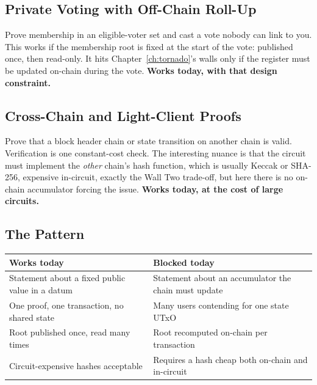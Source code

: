 \subsection*{Private Voting with Off-Chain Roll-Up}

Prove membership in an eligible-voter set and cast a vote nobody can link to
you. This works if the membership root is fixed at the start of the vote:
published once, then read-only. It hits Chapter~\ref{ch:tornado}'s walls only if
the register must be updated on-chain during the vote. \textbf{Works today, with
that design constraint.}

\subsection*{Cross-Chain and Light-Client Proofs}

Prove that a block header chain or state transition on another chain is valid.
Verification is one constant-cost check. The interesting nuance is that the
circuit must implement the \emph{other} chain's hash function, which is usually
Keccak or SHA-256, expensive in-circuit, exactly the Wall Two trade-off, but
here there is no on-chain accumulator forcing the issue. \textbf{Works today, at
the cost of large circuits.}

\subsection*{The Pattern}

\begin{center}
\begin{tabular}{p{5.6cm}p{6.4cm}}
  \hline
  \textbf{Works today} & \textbf{Blocked today} \\
  \hline
  Statement about a fixed public value in a datum
    & Statement about an accumulator the chain must update \\
  \addlinespace
  One proof, one transaction, no shared state
    & Many users contending for one state UTxO \\
  \addlinespace
  Root published once, read many times
    & Root recomputed on-chain per transaction \\
  \addlinespace
  Circuit-expensive hashes acceptable
    & Requires a hash cheap both on-chain and in-circuit \\
  \hline
\end{tabular}
\end{center}

